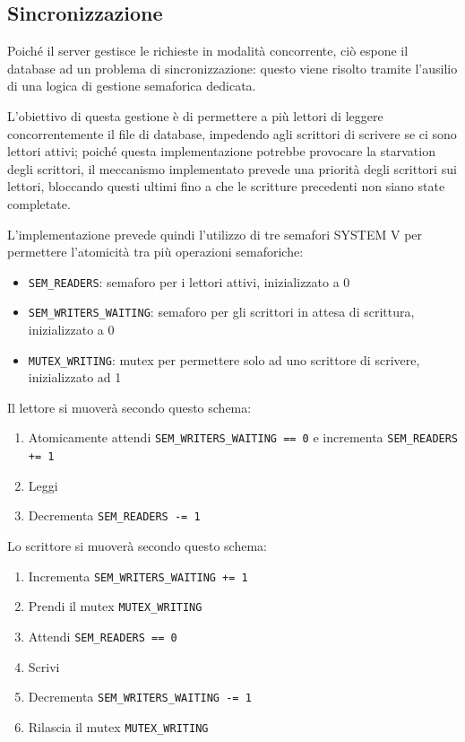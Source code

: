 \documentclass[11pt, a4paper]{article}
\begin{document}
	\subsection{Sincronizzazione}

	Poiché il server gestisce le richieste in modalità concorrente, ciò espone il database ad un problema di sincronizzazione: questo viene risolto tramite l'ausilio di una logica di gestione semaforica dedicata.
	
	L'obiettivo di questa gestione è di permettere a più lettori di leggere concorrentemente il file di database, impedendo agli scrittori di scrivere se ci sono lettori attivi; poiché questa implementazione potrebbe provocare la starvation degli scrittori, il meccanismo implementato prevede una priorità degli scrittori sui lettori, bloccando questi ultimi fino a che le scritture precedenti non siano state completate.
	
	L'implementazione prevede quindi l'utilizzo di tre semafori SYSTEM V per permettere l'atomicità tra più operazioni semaforiche:
	
	\begin{itemize}
		\item \texttt{SEM\_READERS}: semaforo per i lettori attivi, inizializzato a 0
		\item \texttt{SEM\_WRITERS\_WAITING}: semaforo per gli scrittori in attesa di scrittura, inizializzato a 0
		\item \texttt{MUTEX\_WRITING}: mutex per permettere solo ad uno scrittore di scrivere, inizializzato ad 1
	\end{itemize}
	
	Il lettore si muoverà secondo questo schema:
	
	\begin{enumerate}
		\item Atomicamente attendi \texttt{SEM\_WRITERS\_WAITING == 0} e incrementa \texttt{SEM\_READERS += 1}
		\item Leggi
		\item Decrementa \texttt{SEM\_READERS -= 1}
	\end{enumerate}
	
	Lo scrittore si muoverà secondo questo schema:
	
	\begin{enumerate}
		\item Incrementa \texttt{SEM\_WRITERS\_WAITING += 1}
		\item Prendi il mutex \texttt{MUTEX\_WRITING}
		\item Attendi \texttt{SEM\_READERS == 0}
		\item Scrivi
		\item Decrementa \texttt{SEM\_WRITERS\_WAITING -= 1}
		\item Rilascia il mutex \texttt{MUTEX\_WRITING}
	\end{enumerate}
	
\end{document}
